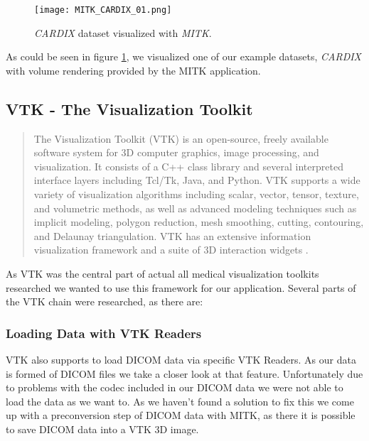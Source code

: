 \begin{figure}[h]
	\centering
	\texttt{[image: MITK\_CARDIX\_01.png]} \\
	\caption{ \emph{CARDIX}\cite{gimias_sampledata_2018} dataset visualized with \emph{MITK}.}
	\label{fig:MITK_CARDIX_01}
\end{figure}

As could be seen in figure \ref{fig:MITK_CARDIX_01}, we visualized one of our example datasets, \emph{CARDIX} with volume rendering provided by the MITK application.


\subsection{VTK - The Visualization Toolkit}

\blockquote{The Visualization Toolkit (VTK) is an open-source, freely available software system for 3D computer graphics, image processing, and visualization. It consists of a C++ class library and several interpreted interface layers including Tcl/Tk, Java, and Python. VTK supports a wide variety of visualization algorithms including scalar, vector, tensor, texture, and volumetric methods, as well as advanced modeling techniques such as implicit modeling, polygon reduction, mesh smoothing, cutting, contouring, and Delaunay triangulation. VTK has an extensive information visualization framework and a suite of 3D interaction widgets \cite{vtk_2018}.}

As VTK was the central part of actual all medical visualization toolkits researched we wanted to use this framework for our application.  
Several parts of the VTK chain were researched, as there are:

\subsubsection{Loading Data with VTK Readers}

VTK also supports to load DICOM data via specific VTK Readers. As our data is formed of DICOM files we take a closer look at that feature. Unfortunately due to problems with the codec included in our DICOM data we were not able to load the data as we want to. As we haven't found a solution to fix this we come up with a preconversion step of DICOM data with MITK, as there it is possible to save DICOM data into a VTK 3D image.  


